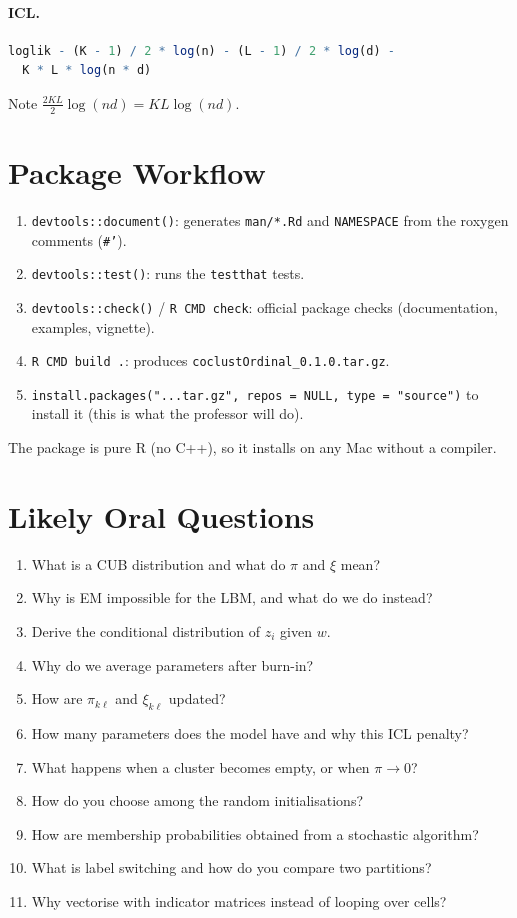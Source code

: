 \paragraph{ICL.}
\begin{lstlisting}[language=R]
loglik - (K - 1) / 2 * log(n) - (L - 1) / 2 * log(d) -
  K * L * log(n * d)
\end{lstlisting}
Note $\tfrac{2KL}{2}\log(nd)=KL\log(nd)$.

\section{Package Workflow}

\begin{enumerate}
  \item \texttt{devtools::document()}: generates \texttt{man/*.Rd} and
  \texttt{NAMESPACE} from the roxygen comments (\texttt{\#'}).
  \item \texttt{devtools::test()}: runs the \texttt{testthat} tests.
  \item \texttt{devtools::check()} / \texttt{R CMD check}: official
  package checks (documentation, examples, vignette).
  \item \texttt{R CMD build .}: produces \texttt{coclustOrdinal\_0.1.0.tar.gz}.
  \item \texttt{install.packages("...tar.gz", repos = NULL, type = "source")}
  to install it (this is what the professor will do).
\end{enumerate}

The package is pure R (no C++), so it installs on any Mac without a compiler.

\section{Likely Oral Questions}

\begin{enumerate}
  \item What is a CUB distribution and what do $\pi$ and $\xi$ mean?
  \item Why is EM impossible for the LBM, and what do we do instead?
  \item Derive the conditional distribution of $z_i$ given $w$.
  \item Why do we average parameters after burn-in?
  \item How are $\pi_{k\ell}$ and $\xi_{k\ell}$ updated?
  \item How many parameters does the model have and why this ICL penalty?
  \item What happens when a cluster becomes empty, or when $\pi\to0$?
  \item How do you choose among the random initialisations?
  \item How are membership probabilities obtained from a stochastic algorithm?
  \item What is label switching and how do you compare two partitions?
  \item Why vectorise with indicator matrices instead of looping over cells?
\end{enumerate}

